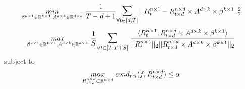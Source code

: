 \begin{equation} \label{lfm_loss}
\underset{\beta^{k \times 1}\in \mathbb{R}^{k\times 1}, A^{d\times k} \in \mathbb{R}^{d\times k}}{min}\hspace{1mm} \frac{1}{T-d+1} \mathlarger{\mathlarger{\sum}}_{\forall t\in [d,T]} \hspace{1mm} ||R^{n\times 1}_t-R^{n\times d}_{t\times d}\times A^{d\times k} \times \beta^{k \times 1}||_2^2
\end{equation}
\begin{equation} \label{lfm_reward}
\underset{\beta^{k \times 1}\in \mathbb{R}^{k\times 1}, A^{d\times k} \in \mathbb{R}^{d\times k}}{max}\hspace{1mm} \frac{1}{S} \mathlarger{\mathlarger{\sum}}_{\forall t\in [T,T+S]} \hspace{1mm} \frac{\langle R^{n\times 1}_t,R^{n\times d}_{t\times d}\times A^{d\times k} \times \beta^{k \times 1}\rangle}{||R^{n\times 1}_t||_2||R^{n\times d}_{t\times d}\times A^{d\times k} \times \beta^{k \times 1}||_2}
\end{equation}
subject to
\begin{equation} \label{lfm_cond}
\underset{R^{n\times d}_{t\times d} \in \mathbb{R}^{n\times d}}{max}\hspace{1mm} cond_{rel}(f,R^{n\times d}_{t\times d}) \le \alpha
\end{equation}

